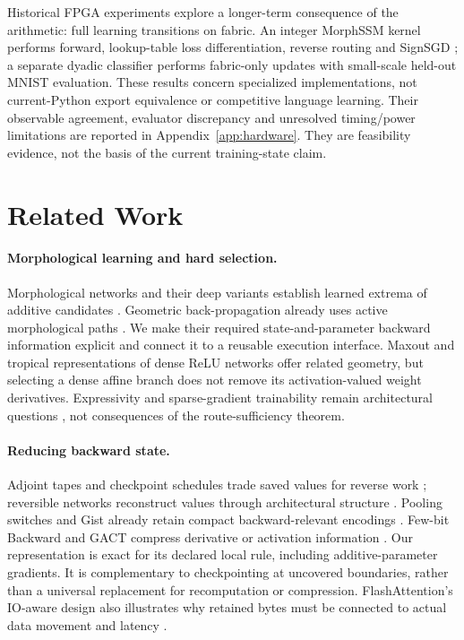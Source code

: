\documentclass{article}
\theoremstyle{plain}
\theoremstyle{definition}
\theoremstyle{remark}
\begin{document}
Historical FPGA experiments explore a longer-term consequence of the
arithmetic: full learning transitions on fabric. An integer MorphSSM
kernel performs forward, lookup-table loss differentiation, reverse routing
and SignSGD \citep{bernstein2018signsgd}; a separate dyadic classifier
performs fabric-only updates with small-scale held-out MNIST evaluation.
These results concern specialized implementations, not current-Python
export equivalence or competitive language learning. Their observable
agreement, evaluator discrepancy and unresolved timing/power limitations
are reported in Appendix~\ref{app:hardware}. They are feasibility evidence,
not the basis of the current training-state claim.

\section{Related Work}

\paragraph{Morphological learning and hard selection.}
Morphological networks and their deep variants establish learned extrema
of additive candidates \citep{ritter1996morphological,franchi2020morphological}.
Geometric back-propagation already uses active morphological paths
\citep{groenendijk2023geometric}. We make their required state-and-parameter
backward information explicit and connect it to a reusable execution
interface. Maxout \citep{goodfellow2013maxout} and tropical representations
of dense ReLU networks \citep{zhang2018tropical} offer related geometry,
but selecting a dense affine branch does not remove its activation-valued
weight derivatives. Expressivity and sparse-gradient trainability remain
architectural questions \citep{fotopoulos2025training}, not consequences of
the route-sufficiency theorem.

\paragraph{Reducing backward state.}
Adjoint tapes and checkpoint schedules trade saved values for reverse work
\citep{giering1998recipes,griewank2000revolve,chen2016sublinear,jain2020checkmate};
reversible networks reconstruct values through architectural structure
\citep{gomez2017reversible}. Pooling switches and Gist already retain compact
backward-relevant encodings \citep{zeiler2014visualizing,jain2018gist}.
Few-bit Backward and GACT compress derivative or activation information
\citep{novikov2023fewbit,liu2022gact}. Our representation is exact for its
declared local rule, including additive-parameter gradients. It is
complementary to checkpointing at uncovered boundaries, rather than a
universal replacement for recomputation or compression. FlashAttention's
IO-aware design also illustrates why retained bytes must be connected to
actual data movement and latency \citep{dao2022flashattention}.
\end{document}
